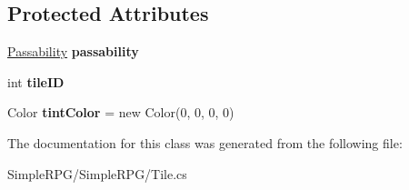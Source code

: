 \subsection*{Protected Attributes}
\begin{DoxyCompactItemize}
\item 
\hypertarget{class_simple_r_p_g_1_1_tile_a8d68c342f4626a31c30910751438af0f}{\hyperlink{namespace_simple_r_p_g_a5f1ec21e7f4e36278a6cedd38c51e650}{Passability} {\bfseries passability}}\label{class_simple_r_p_g_1_1_tile_a8d68c342f4626a31c30910751438af0f}

\item 
\hypertarget{class_simple_r_p_g_1_1_tile_ad7fb73f618a270d551b509c4f76ad0f2}{int {\bfseries tile\-I\-D}}\label{class_simple_r_p_g_1_1_tile_ad7fb73f618a270d551b509c4f76ad0f2}

\item 
\hypertarget{class_simple_r_p_g_1_1_tile_a819196759baca2d0cf954e45368c1d8a}{Color {\bfseries tint\-Color} = new Color(0, 0, 0, 0)}\label{class_simple_r_p_g_1_1_tile_a819196759baca2d0cf954e45368c1d8a}

\end{DoxyCompactItemize}


The documentation for this class was generated from the following file\-:\begin{DoxyCompactItemize}
\item 
Simple\-R\-P\-G/\-Simple\-R\-P\-G/Tile.\-cs\end{DoxyCompactItemize}
